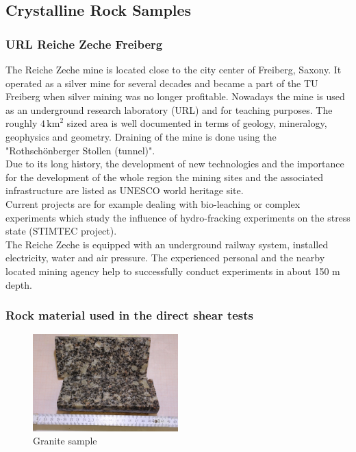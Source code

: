 \subsection{Crystalline Rock Samples}

\subsubsection{URL Reiche Zeche Freiberg}
The Reiche Zeche mine is located close to the city center of Freiberg, Saxony. It operated as a silver mine for several decades and became a part of the TU Freiberg when silver mining was no longer profitable. Nowadays the mine is used as an underground research laboratory (URL) and for teaching purposes. The roughly $4\,\text{km}^2$ sized area is well documented in terms of geology, mineralogy, geophysics and geometry. Draining of the mine is done using the "Rothsch\"onberger Stollen (tunnel)".\\
Due to its long history, the development of new technologies and the importance for the development of the whole region the mining sites and the associated infrastructure are listed as UNESCO world heritage site.\\
Current projects are for example dealing with bio-leaching or complex experiments which study the influence of hydro-fracking experiments on the stress state (STIMTEC project).\\
The Reiche Zeche is equipped with an underground railway system, installed electricity, water and air pressure. The experienced personal and the nearby located mining agency help to successfully conduct experiments in about 150 m depth. 




\subsubsection{Rock material used in the direct shear tests}
\begin{figure}[!ht]
\begin{center}
\includegraphics[width=0.5\textwidth]{./figures/ExpRockGranite.JPG}
\end{center}
\caption{Granite sample}
\label{fig:RockGranite}
\end{figure}


